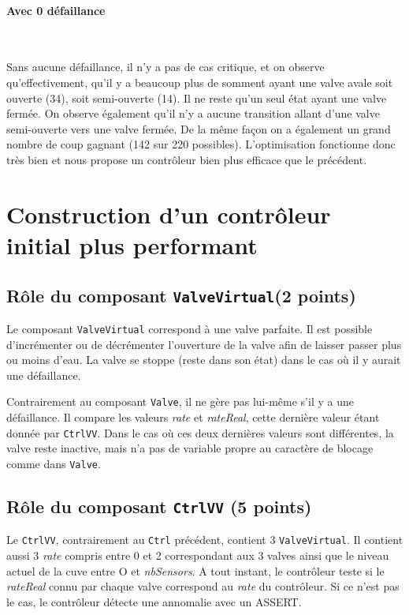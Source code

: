 \documentclass[a4paper]{book}
\begin{document}
\paragraph{Avec 0 défaillance}\

Sans aucune défaillance, il n'y a pas de cas critique, et on observe qu'effectivement, qu'il 
y a beaucoup plus de somment ayant une valve avale soit ouverte (34), soit semi-ouverte (14). Il ne reste qu'un seul état
ayant une valve fermée. On observe également qu'il n'y a aucune transition allant d'une valve semi-ouverte vers une valve fermée.
De la même façon on a également un grand nombre de coup gagnant (142 sur 220 possibles).
L'optimisation fonctionne donc très bien et nous propose un contrôleur bien plus efficace que le précédent.
\section{Construction d'un contrôleur initial plus performant}
\subsection{Rôle du composant {\tt ValveVirtual}(2 points)}
Le composant {\tt ValveVirtual} correspond à une valve parfaite. Il est possible d'incrémenter ou de décrémenter l'ouverture 
de la valve afin de laisser passer plus ou moins d'eau. La valve se stoppe (reste dans son état) dans le cas où il y aurait une défaillance.

Contrairement au composant {\tt Valve}, il ne gère pas lui-même s'il y a une défaillance. Il compare les valeurs \textit{rate} et 
\textit{rateReal}, cette dernière valeur étant donnée par {\tt CtrlVV}. Dans le cas où ces deux dernières valeurs sont différentes, 
la valve reste inactive, mais n'a pas de variable propre au caractère de blocage comme dans {\tt Valve}.

\subsection{Rôle du composant {\tt CtrlVV} (5 points)}
Le {\tt CtrlVV}, contrairement au {\tt Ctrl} précédent, contient 3 {\tt ValveVirtual}. Il contient aussi 3 \textit{rate} 
compris entre 0 et 2 correspondant aux 3 valves ainsi que le niveau actuel de la cuve entre O et \textit{nbSensors}. A tout instant, 
le contrôleur teste si le \textit{rateReal} connu par chaque valve correspond au \textit{rate} du contrôleur. Si ce n'est pas le 
cas, le contrôleur détecte une annomalie avec un ASSERT.
\end{document}
